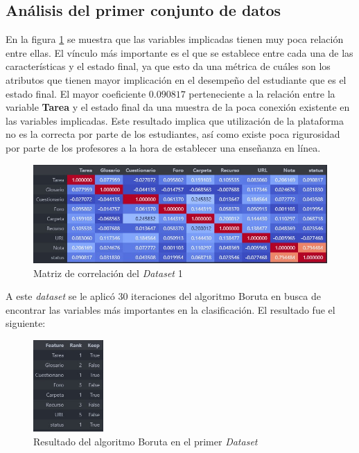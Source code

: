 \subsection{Análisis del primer conjunto de datos}


En la figura \ref*{dataset1_corr} se muestra que las variables implicadas tienen muy poca relación entre ellas. El vínculo más importante es el que se establece entre cada una de las características y el estado final, ya que esto da una métrica de cuáles son los atributos que tienen mayor implicación 
en el desempeño del estudiante que es el estado final. El mayor coeficiente $0.090817$ perteneciente a la relación 
entre la variable \textbf{Tarea} y el estado final da una muestra de la poca conexión existente en las variables implicadas. Este resultado implica que utilización de la plataforma no es la correcta por parte de los estudiantes, así como existe poca rigurosidad por parte de los profesores a la hora de establecer una enseñanza en línea.   

\newpage
\begin{figure}[ht]
    \centering
    \includegraphics[width = 1 \textwidth]{Graphics/corr_dataset1.jpg}
    \caption{Matriz de correlación del \textit{Dataset} 1}
    \label{dataset1_corr}
\end{figure}   


A este \textit{dataset} se le aplicó 30 iteraciones del algoritmo Boruta en busca de encontrar las variables más importantes en la clasificación. El resultado fue el siguiente:   


\begin{figure}[htbp]
    \centering
    \includegraphics[height=3.5cm]{Graphics/boruta_dataset1.jpg}
    \caption{Resultado del algoritmo Boruta en el primer \textit{Dataset}}
    \label{boruta1}
\end{figure}   



